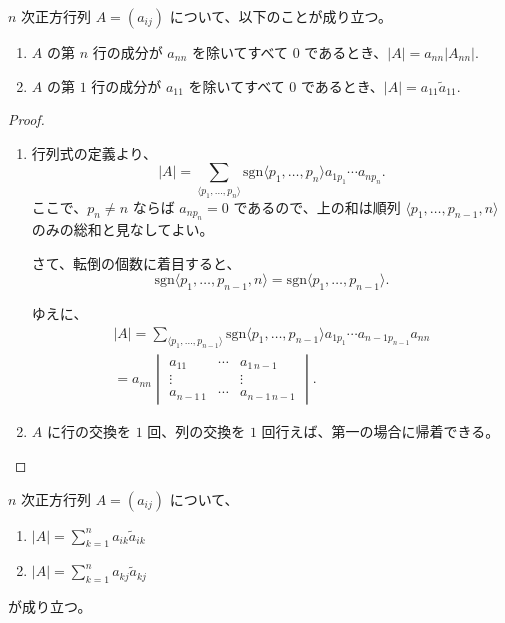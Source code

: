 \begin{lmm}\label{251220165401}
  \(n\) 次正方行列 \(A=(a_{ij})\) について、以下のことが成り立つ。
  \begin{enumerate}
    \item \(A\) の第 \(n\) 行の成分が \(a_{nn}\) を除いてすべて \(0\) であるとき、\(|A|=a_{nn}|A_{nn}|.\)
    \item \(A\) の第 \(1\) 行の成分が \(a_{11}\) を除いてすべて \(0\) であるとき、\(|A|=a_{11}\tilde{a}_{11}.\)
  \end{enumerate}
\end{lmm}

\begin{proof}
  \begin{enumerate}
    \item 行列式の定義より、
      \[|A|=\sum_{\langle p_1,\ldots,p_n\rangle}\mathrm{sgn}\langle p_1,\ldots,p_n\rangle a_{1 p_1}\cdots a_{n p_n}.\]
      ここで、\(p_n\neq n\) ならば \(a_{n p_n}=0\) であるので、上の和は順列 \(\langle p_1,\ldots,p_{n-1},n\rangle\) のみの総和と見なしてよい。

      さて、転倒の個数に着目すると、
      \[\mathrm{sgn}\langle p_1,\ldots,p_{n-1},n\rangle=\mathrm{sgn}\langle p_1,\ldots,p_{n-1}\rangle.\]

      ゆえに、
      \begin{align*}
        |A|=\sum_{\langle p_1,\ldots,p_{n-1}\rangle}\mathrm{sgn}\langle p_1,\ldots,p_{n-1}\rangle a_{1 p_1}\cdots a_{n-1 p_{n-1}}a_{nn} \\
        =a_{nn}
        \begin{vmatrix}
          a_{11}     & \cdots & a_{1\,n-1}   \\
          \vdots     &        & \vdots       \\
          a_{n-1\,1} & \cdots & a_{n-1\,n-1}
        \end{vmatrix}.
      \end{align*}
    \item \(A\) に行の交換を \(1\) 回、列の交換を \(1\) 回行えば、第一の場合に帰着できる。
  \end{enumerate}
\end{proof}

\begin{thm}[展開公式]
  \(n\) 次正方行列 \(A=(a_{ij})\) について、
  \begin{enumerate}
    \item\label{251220160501} \(\displaystyle |A|=\sum_{k=1}^n a_{ik}\tilde{a}_{ik}\)
    \item\label{251220160502} \(\displaystyle |A|=\sum_{k=1}^n a_{kj}\tilde{a}_{kj}\)
  \end{enumerate}
  が成り立つ。
\end{thm}

